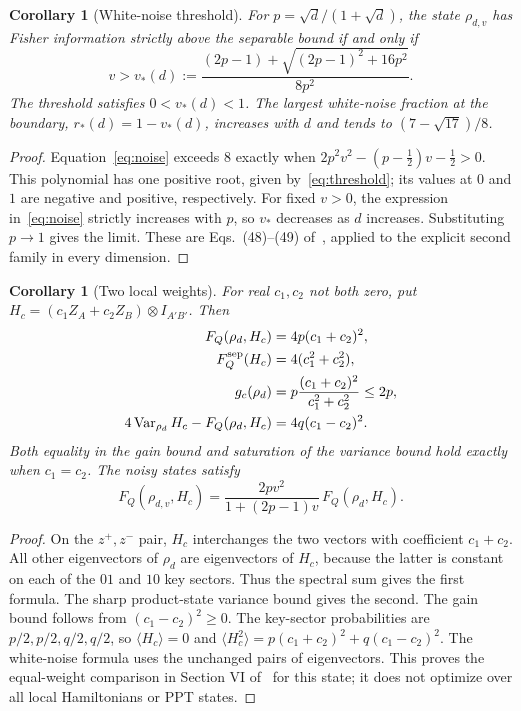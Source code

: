 \documentclass[11pt]{article}
\newtheorem{corollary}[theorem]{Corollary}
\begin{document}
\begin{corollary}[White-noise threshold]\label{cor:noise}
For $p=\sqrt d/(1+\sqrt d)$, the state $\rho_{d,v}$ has Fisher
information strictly above the separable bound if and only if
\begin{equation}\label{eq:threshold}
 v>v_*(d):=\frac{(2p-1)+\sqrt{(2p-1)^2+16p^2}}{8p^2}.
\end{equation}
The threshold satisfies $0<v_*(d)<1$. The largest white-noise fraction
at the boundary, $r_*(d)=1-v_*(d)$, increases with $d$ and tends to
$(7-\sqrt{17})/8$.
\end{corollary}
\begin{proof}
Equation~\eqref{eq:noise} exceeds $8$ exactly when
$2p^2v^2-(p-\tfrac12)v-\tfrac12>0$.
This polynomial has one positive root, given by~\eqref{eq:threshold};
its values at $0$ and $1$ are negative and positive, respectively.
For fixed $v>0$, the expression in~\eqref{eq:noise} strictly increases
with $p$, so $v_*$ decreases as $d$ increases. Substituting $p\to1$
gives the limit. These are Eqs.\ (48)--(49) of~\cite{Pal2021},
applied to the explicit second family in every dimension.
\end{proof}

\begin{corollary}[Two local weights]\label{cor:weights}
For real $c_1,c_2$ not both zero, put
$H_c=(c_1Z_A+c_2Z_B)\otimes I_{A'B'}$. Then
\begin{align}
 F_Q(\rho_d,H_c)&=4p(c_1+c_2)^2,\\
 F_Q^{\rm sep}(H_c)&=4(c_1^2+c_2^2),\\
 g_c(\rho_d)&=p\frac{(c_1+c_2)^2}{c_1^2+c_2^2}\leq2p,\\
 4\operatorname{Var}_{\rho_d}H_c-F_Q(\rho_d,H_c)
   &=4q(c_1-c_2)^2.\label{eq:weights}
\end{align}
Both equality in the gain bound and saturation of the variance bound
hold exactly when $c_1=c_2$. The noisy states satisfy
\[
 F_Q(\rho_{d,v},H_c)
 =\frac{2pv^2}{1+(2p-1)v}\,F_Q(\rho_d,H_c).
\]
\end{corollary}
\begin{proof}
On the $z^+,z^-$ pair, $H_c$ interchanges the two vectors with
coefficient $c_1+c_2$. All other eigenvectors of $\rho_d$ are
eigenvectors of $H_c$, because the latter is constant on each of
the $01$ and $10$ key sectors. Thus the spectral sum gives the first
formula. The sharp product-state variance bound gives the second.
The gain bound follows from $(c_1-c_2)^2\geq0$.
The key-sector probabilities are $p/2,p/2,q/2,q/2$, so
$\langle H_c\rangle=0$ and
$\langle H_c^2\rangle=p(c_1+c_2)^2+q(c_1-c_2)^2$.
The white-noise formula uses the unchanged pairs of eigenvectors.
This proves the equal-weight comparison in Section VI of~\cite{Pal2021}
for this state; it does not optimize over all local Hamiltonians or PPT states.
\end{proof}
\end{document}
